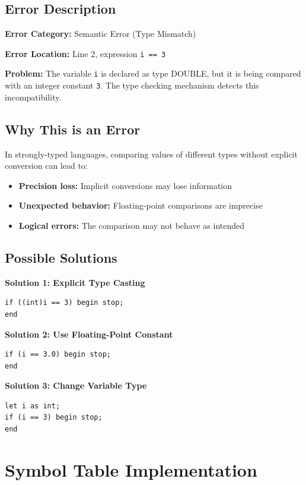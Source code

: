 \documentclass[12pt,a4paper]{article}
\begin{document}
\subsection{Error Description}

\textbf{Error Category:} Semantic Error (Type Mismatch)

\textbf{Error Location:} Line 2, expression \texttt{i == 3}

\textbf{Problem:} The variable \texttt{i} is declared as type DOUBLE, but it is being compared with an integer constant \texttt{3}. The type checking mechanism detects this incompatibility.

\subsection{Why This is an Error}

In strongly-typed languages, comparing values of different types without explicit conversion can lead to:
\begin{itemize}
    \item \textbf{Precision loss:} Implicit conversions may lose information
    \item \textbf{Unexpected behavior:} Floating-point comparisons are imprecise
    \item \textbf{Logical errors:} The comparison may not behave as intended
\end{itemize}

\subsection{Possible Solutions}

\textbf{Solution 1: Explicit Type Casting}
\begin{lstlisting}
if ((int)i == 3) begin stop;
end
\end{lstlisting}

\textbf{Solution 2: Use Floating-Point Constant}
\begin{lstlisting}
if (i == 3.0) begin stop;
end
\end{lstlisting}

\textbf{Solution 3: Change Variable Type}
\begin{lstlisting}
let i as int;
if (i == 3) begin stop;
end
\end{lstlisting}

\section{Symbol Table Implementation}
\end{document}
